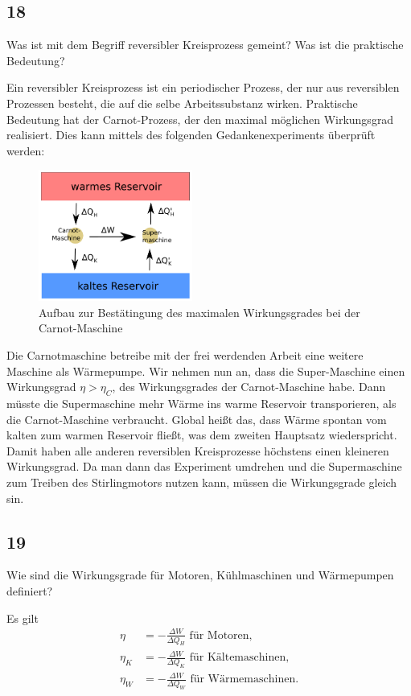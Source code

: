 \documentclass[12pt,a4paper]{report}
\newenvironment{myfrag}{\begin{it}}{\end{it}\vspace{3mm}\par}
\numberwithin{equation}{section}
\begin{document}
\subsection{18}
\begin{myfrag}
Was ist mit dem Begriff reversibler Kreisprozess gemeint? Was ist die praktische
Bedeutung?
\end{myfrag}
Ein reversibler Kreisprozess ist ein periodischer Prozess, der nur aus reversiblen Prozessen besteht, die auf die selbe Arbeitssubstanz wirken. Praktische Bedeutung hat der Carnot-Prozess, der den maximal möglichen Wirkungsgrad realisiert. Dies kann mittels des folgenden Gedankenexperiments überprüft werden:
\begin{figure}[H]
\centering
\includegraphics[width=0.45\textwidth]{Bilder/fr18.pdf}%
\caption{Aufbau zur Bestätingung des maximalen Wirkungsgrades bei der Carnot-Maschine}
\end{figure}
Die Carnotmaschine betreibe mit der frei werdenden Arbeit eine weitere Maschine als Wärmepumpe. Wir nehmen nun an, dass die Super-Maschine einen Wirkungsgrad $\eta>\eta_C$, des Wirkungsgrades der Carnot-Maschine habe. Dann müsste die Supermaschine mehr Wärme ins warme Reservoir transporieren, als die Carnot-Maschine verbraucht. Global heißt das, dass Wärme spontan vom kalten zum warmen Reservoir fließt, was dem zweiten Hauptsatz wiederspricht. Damit haben alle anderen reversiblen Kreisprozesse höchstens einen kleineren Wirkungsgrad. Da man dann das Experiment umdrehen und die Supermaschine zum Treiben des Stirlingmotors nutzen kann, müssen die Wirkungsgrade gleich sin.

\subsection{19}
\begin{myfrag}
Wie sind die Wirkungsgrade für Motoren, Kühlmaschinen und Wärmepumpen
definiert?
\end{myfrag}
Es gilt
\begin{align}
	\eta&=-\frac{\Delta W}{\Delta Q_H}\text{ für Motoren,}\\
	\eta_K&=-\frac{\Delta W}{\Delta Q_K}\text{ für Kältemaschinen,}\\
	\eta_W&=-\frac{\Delta W}{\Delta Q_W}\text{ für Wärmemaschinen.}
\end{align}
\end{document}
